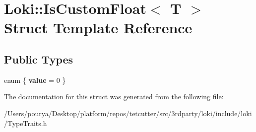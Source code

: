 \hypertarget{structLoki_1_1IsCustomFloat}{}\section{Loki\+:\+:Is\+Custom\+Float$<$ T $>$ Struct Template Reference}
\label{structLoki_1_1IsCustomFloat}
\subsection*{Public Types}
\begin{DoxyCompactItemize}
\item 
\hypertarget{structLoki_1_1IsCustomFloat_a5e6e2e2facb8ec0b2668a5be8749fe44}{}enum \{ {\bfseries value} = 0
 \}\label{structLoki_1_1IsCustomFloat_a5e6e2e2facb8ec0b2668a5be8749fe44}

\end{DoxyCompactItemize}


The documentation for this struct was generated from the following file\+:\begin{DoxyCompactItemize}
\item 
/\+Users/pourya/\+Desktop/platform/repos/tetcutter/src/3rdparty/loki/include/loki/Type\+Traits.\+h\end{DoxyCompactItemize}
